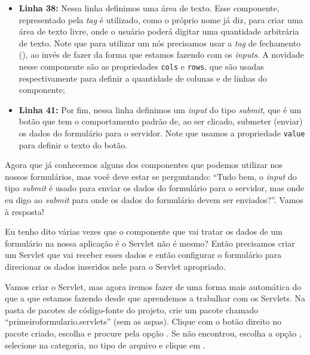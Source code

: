 \begin{itemize}
    \item \textbf{Linha 38:} Nessa linha definimos uma área de texto. Esse componente, representado pela \textit{tag}  é utilizado, como o próprio nome já diz, para criar uma área de texto livre, onde o usuário poderá digitar uma quantidade arbitrária de texto. Note que para utilizar um  nós precisamos usar a \textit{tag} de fechamento (), ao invés de fazer da forma que estamos fazendo com os \textit{inputs}. A novidade nesse componente são as propriedades \texttt{cols} e \texttt{rows}, que são usadas respectivamente para definir a quantidade de colunas e de linhas do componente;
    
    \item \textbf{Linha 41:} Por fim, nessa linha definimos um \textit{input} do tipo \textit{submit}, que é um botão que tem o comportamento padrão de, ao ser clicado, submeter (enviar) os dados do formulário para o servidor. Note que usamos a propriedade \texttt{value} para definir o texto do botão.
\end{itemize}

Agora que já conhecemos alguns dos componentes que podemos utilizar nos nossos formulários, mas você deve estar se perguntando: ``Tudo bem, o \textit{input} do tipo \textit{submit} é usado para enviar os dados do formulário para o servidor, mas onde eu digo ao \textit{submit} para onde os dados do formulário devem ser enviados?''. Vamos à resposta!

Eu tenho dito várias vezes que o componente que vai tratar os dados de um formulário na nossa aplicação é o Servlet não é mesmo? Então precisamos criar um Servlet que vai receber esses dados e então configurar o formulário para direcionar os dados inseridos nele para o Servlet apropriado.

Vamos criar o Servlet, mas agora iremos fazer de uma forma mais automática do que a que estamos fazendo desde que aprendemos a trabalhar com os Servlets. Na pasta de pacotes de código-fonte do projeto, crie um pacote chamado ``primeiroformulario.servlets'' (sem as aspas). Clique com o botão direito no pacote criado, escolha  e procure pela opção . Se não encontrou, escolha a opção , selecione  na categoria,  no tipo de arquivo e clique em .

